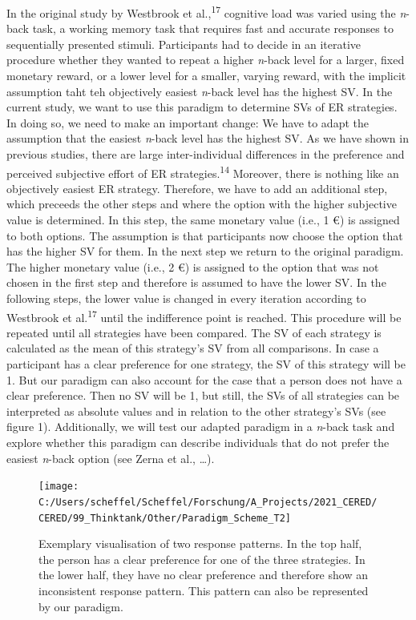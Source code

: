 \documentclass[
  english,
  man,floatsintext]{apa6}
\begin{document}
In the original study by Westbrook et al.,\textsuperscript{17} cognitive load was varied using the \emph{n}-back task, a working memory task that requires fast and accurate responses to sequentially presented stimuli.
Participants had to decide in an iterative procedure whether they wanted to repeat a higher \emph{n}-back level for a larger, fixed monetary reward, or a lower level for a smaller, varying reward, with the implicit assumption taht teh objectively easiest \emph{n}-back level has the highest SV.
In the current study, we want to use this paradigm to determine SVs of ER strategies.
In doing so, we need to make an important change: We have to adapt the assumption that the easiest \emph{n}-back level has the highest SV.
As we have shown in previous studies, there are large inter-individual differences in the preference and perceived subjective effort of ER strategies.\textsuperscript{14}
Moreover, there is nothing like an objectively easiest ER strategy.
Therefore, we have to add an additional step, which preceeds the other steps and where the option with the higher subjective value is determined.
In this step, the same monetary value (i.e., 1 €) is assigned to both options.
The assumption is that participants now choose the option that has the higher SV for them.
In the next step we return to the original paradigm.
The higher monetary value (i.e., 2 €) is assigned to the option that was not chosen in the first step and therefore is assumed to have the lower SV.
In the following steps, the lower value is changed in every iteration according to Westbrook et al.\textsuperscript{17} until the indifference point is reached.
This procedure will be repeated until all strategies have been compared.
The SV of each strategy is calculated as the mean of this strategy's SV from all comparisons.
In case a participant has a clear preference for one strategy, the SV of this strategy will be 1.
But our paradigm can also account for the case that a person does not have a clear preference.
Then no SV will be 1, but still, the SVs of all strategies can be interpreted as absolute values and in relation to the other strategy's SVs (see figure 1).
Additionally, we will test our adapted paradigm in a \emph{n}-back task and explore whether this paradigm can describe individuals that do not prefer the easiest \emph{n}-back option (see Zerna et al., \ldots).

\begin{figure}
\texttt{[image: C:/Users/scheffel/Scheffel/Forschung/A\_Projects/2021\_CERED/CERED/99\_Thinktank/Other/Paradigm\_Scheme\_T2]} \caption{Exemplary visualisation of two response patterns. In the top half, the person has a clear preference for one of the three strategies. In the lower half, they have no clear preference and therefore show an inconsistent response pattern. This pattern can also be represented by our paradigm.}\label{fig:fig1}
\end{figure}
\end{document}
